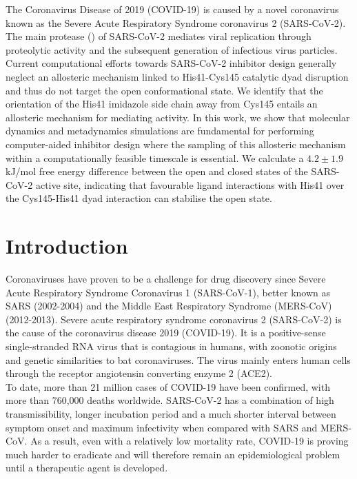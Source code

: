 The Coronavirus Disease of 2019 (COVID-19) is caused by a novel coronavirus known as the Severe Acute Respiratory Syndrome coronavirus 2 (SARS-CoV-2). The main protease (\mpro\!\!) of SARS-CoV-2 mediates viral replication through proteolytic activity and the subsequent generation of infectious virus particles. Current computational efforts towards SARS-CoV-2 \mpro inhibitor design generally neglect an allosteric mechanism linked to His41-Cys145 catalytic dyad disruption and thus do not target the open conformational state. We identify that the orientation of the His41 imidazole side chain away from Cys145 entails an allosteric mechanism for mediating \mpro activity. In this work, we show that molecular dynamics and metadynamics simulations are fundamental for performing computer-aided \mpro inhibitor design where the sampling of this allosteric mechanism within a computationally feasible timescale is essential. We calculate a $4.2 \pm 1.9$ kJ/mol free energy difference between the open and closed states of the SARS-CoV-2 \mpro active site, indicating that favourable ligand interactions with His41 over the Cys145-His41 dyad interaction can stabilise the open state.

\section{Introduction}
Coronaviruses have proven to be a challenge for drug discovery since Severe Acute Respiratory Syndrome Coronavirus 1 (SARS-CoV-1), better known as SARS (2002-2004) and the Middle East Respiratory Syndrome (MERS-CoV) (2012-2013). Severe acute respiratory syndrome coronavirus 2 (SARS-CoV-2) is the cause of the coronavirus disease 2019 (COVID-19). It is a positive-sense single-stranded RNA virus that is contagious in humans, with zoonotic origins and genetic similarities to bat coronaviruses.\cite{andersen2020proximal} The virus mainly enters human cells through the receptor angiotensin converting enzyme 2 (ACE2).\cite{shang2020structural} \\

To date, more than 21 million cases of COVID-19 have been confirmed, with more than 760,000 deaths worldwide.\cite{whoreport} SARS-CoV-2 has a combination of high transmissibility, longer incubation period and a much shorter interval between symptom onset and maximum infectivity when compared with SARS and MERS-CoV.\cite{petersen2020comparing} As a result, even with a relatively low mortality rate, COVID-19 is proving much harder to eradicate and will therefore remain an epidemiological problem until a therapeutic agent is developed.\\

